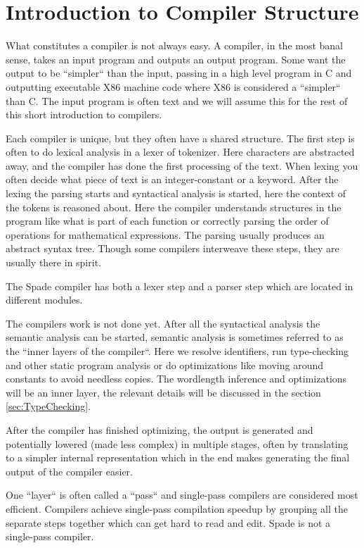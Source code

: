 \documentclass[msc,lith,english]{liuthesis}
\begin{document}
\section{Introduction to Compiler Structure}
What constitutes a compiler is not always easy. A compiler, in the most banal sense, takes an input program and outputs an output program. Some want the output to be ``simpler`` than the input, passing in a high level program in C and outputting executable X86 machine code where X86 is considered a ``simpler`` than C. The input program is often text and we will assume this for the rest of this short introduction to compilers.

Each compiler is unique, but they often have a shared structure. The first step is often to do lexical analysis in a lexer of tokenizer. Here characters are abstracted away, and the compiler has done the first processing of the text. When lexing you often decide what piece of text is an integer-constant or a keyword. After the lexing the parsing starts and syntactical analysis is started, here the context of the tokens is reasoned about. Here the compiler understands structures in the program like what is part of each function or correctly parsing the order of operations for mathematical expressions. The parsing usually produces an abstract syntax tree. Though some compilers interweave these steps, they are usually there in spirit.

The Spade compiler has both a lexer step and a parser step which are located in different modules.

The compilers work is not done yet. After all the syntactical analysis the semantic analysis can be started, semantic analysis is sometimes referred to as the ``inner layers of the compiler``. Here we resolve identifiers, run type-checking and other static program analysis or do optimizations like moving around constants to avoid needless copies. The wordlength inference and optimizations will be an inner layer, the relevant details will be discussed in the section \ref{sec:TypeChecking}. 

After the compiler has finished optimizing, the output is generated and potentially lowered (made less complex) in multiple stages, often by translating to a simpler internal representation which in the end makes generating the final output of the compiler easier.

One ``layer`` is often called a ``pass`` and single-pass compilers are considered most efficient. Compilers achieve single-pass compilation speedup by grouping all the separate steps together which can get hard to read and edit. Spade is not a single-pass compiler.
\end{document}
